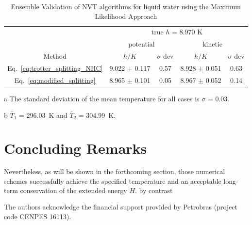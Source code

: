 \documentclass[
journal=jctcce,
layout=twocolumn
]{achemso}
\newcommand{\timestep}{h}
\begin{document}
\begin{table}
	\begin{threeparttable}
		\caption{Ensemble Validation of NVT algorithms for liquid water using the Maximum Likelihood Approach  }
		\label{table:ensemblevalidation}
			\begin{tabular}{ccccc}
				& \multicolumn{4}{c}{true $\timestep$ = 8.970 K} \\
				\cline{2-5}
				& \multicolumn{2}{c}{potential} & \multicolumn{2}{c}{kinetic}\\
				\hline
				Method  &$\timestep/K$ & $\sigma$ dev & $\timestep/K$ & $\sigma$ dev \\
				\hline %
				Eq.~\eqref{eq:trotter_splitting_NHC} & 9.022 $\pm$ 0.117 & 0.57 & 8.928 $\pm$ 0.051 & 0.63 \\
				Eq.~\eqref{eq:modified_splitting}    & 8.965 $\pm$ 0.101 & 0.05 & 8.967 $\pm$ 0.052 & 0.14
		\end{tabular}
		\begin{tablenotes}
			\item[a] The standard deviation of the mean temperature for all cases is $\sigma$ = 0.03.
			\item[b] $\bar{T}_1$ = 296.03~K and $\bar{T}_2$ = 304.99~K.
		\end{tablenotes}
	\end{threeparttable}
\end{table}



\section{Concluding Remarks}
\label{sec:conclusion}
Nevertheless, as will be shown in the forthcoming section, those numerical schemes successfully achieve the specified temperature and an acceptable long-term conservation of the extended energy $H$. 
by contrast

\begin{acknowledgement}
	The authors acknowledge the financial support provided by Petrobras (project code CENPES 16113).
\end{acknowledgement}
\end{document}
